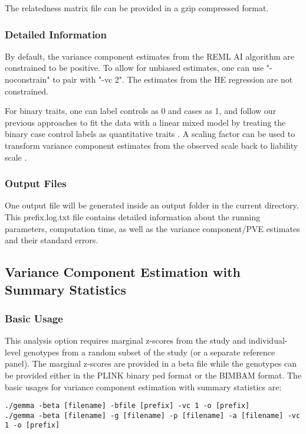 \documentclass[11pt]{article}
\begin{document}
The relatedness matrix file can be provided in a gzip compressed format.

\subsubsection{Detailed Information}

By default, the variance component estimates from the REML AI
algorithm are constrained to be positive. To allow for unbiased
estimates, one can use "-noconstrain" to pair with "-vc 2". The
estimates from the HE regression are not constrained.

For binary traits, one can label controls as 0 and cases as 1, and
follow our previous approaches to fit the data with a linear mixed
model by treating the binary case control labels as quantitative
traits \cite{Zhou:2013}. A scaling factor can be used to transform
variance component estimates from the observed scale back to liability
scale \cite{Zhou:2013}.

\subsubsection{Output Files}

One output file will be generated inside an output folder in the
current directory. This prefix.log.txt file contains detailed
information about the running parameters, computation time, as well as
the variance component/PVE estimates and their standard errors.

\subsection{Variance Component Estimation with Summary Statistics}

\subsubsection{Basic Usage}

This analysis option requires marginal z-scores from the study and
individual-level genotypes from a random subset of the study (or a
separate reference panel). The marginal z-scores are provided in a
beta file while the genotypes can be provided either in the PLINK
binary ped format or the BIMBAM format. The basic usages for variance
component estimation with summary statistics are:

\begin{verbatim}
./gemma -beta [filename] -bfile [prefix] -vc 1 -o [prefix]
./gemma -beta [filename] -g [filename] -p [filename] -a [filename] -vc 1 -o [prefix]
\end{verbatim}
\end{document}

